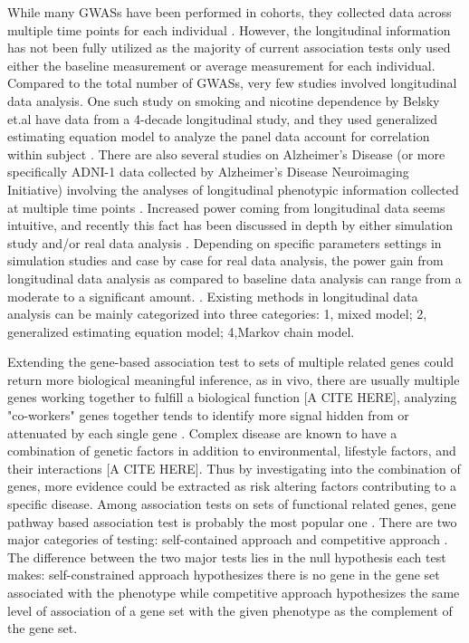 \documentclass[12pt]{article}
\begin{document}
While many GWASs have been performed in cohorts, they collected data across multiple time points for each individual \cite{Aulchenko2009,Ionita-Laza2007,Kamatani2010,Kathiresan2007,Sabatti2008}. However, the longitudinal information has not been fully utilized as the majority of current association tests only used either the baseline measurement or average measurement for each individual\cite{Sabatti2008,Ionita-Laza2007,Kamatani2010,Kathiresan2007}. Compared to the total number of GWASs, very few studies involved longitudinal data analysis. One such study on smoking and nicotine dependence by Belsky et.al have data from a 4-decade longitudinal study, and they used generalized estimating equation model to analyze the panel data account for correlation within subject \cite{Belsky2013}. There are also several studies on Alzheimer's Disease (or more specifically ADNI-1 data collected by Alzheimer's Disease Neuroimaging Initiative) involving the analyses of longitudinal phenotypic information collected at multiple time points \cite{Wang2012,Melville2012,Silver2012}. Increased power coming from longitudinal data seems intuitive, and recently this fact has been discussed in depth by either simulation study and/or real data analysis \cite{Xu2014,Furlotte2012}. Depending on specific parameters settings in simulation studies and case by case for real data analysis, the power gain from longitudinal data analysis as compared to baseline data analysis can range from a moderate to a significant amount. \cite{Xu2014,Furlotte2012}. Existing methods in longitudinal data analysis can be mainly categorized into three categories: 1, mixed model; 2, generalized estimating equation model; 4,Markov chain model.

Extending the gene-based association test to sets of multiple related genes could return more biological meaningful inference, as in vivo, there are usually multiple genes working together to fulfill a biological function [A CITE HERE], analyzing "co-workers" genes together tends to identify more signal hidden from or attenuated by each single gene . Complex disease are known to have a combination of genetic factors in addition to environmental, lifestyle factors, and their interactions [A CITE HERE]. Thus by investigating into the combination of genes, more evidence could be extracted as risk altering factors contributing to a specific disease. Among association tests on sets of functional related genes, gene pathway based association test is probably the most popular one \cite{DelaCruz2010,Wang2010}. There are two major categories of testing: self-contained approach and competitive approach \cite{Wang2010,Nam2008,Goeman2007}. The difference between the two major tests lies in the null hypothesis each test makes: self-constrained approach hypothesizes there is no gene in the gene set associated with the phenotype while competitive approach hypothesizes the same level of association of a gene set with the given phenotype as the complement of the gene set. 
\end{document}
